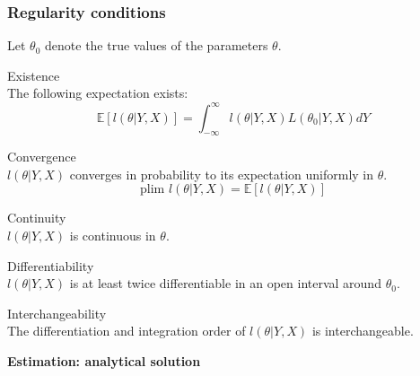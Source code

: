 \documentclass[notes,blackandwhite,mathsans]{beamer}
\begin{document}
\begin{frame}
\frametitle{Regularity conditions}

{\color{mcxs3}Let} $\theta_0$ {\color{mcxs3}denote the} {\color{mcxs2}true values} {\color{mcxs3}of the parameters} $\theta$.

\begin{description}[leftmargin=0.65cm] \small
\item[A1] Existence\\ \footnotesize
{\color{mcxs3}The following expectation exists:}
$$ \mathbb{E}[l(\theta|Y,X)] = \int_{-\infty}^{\infty} l(\theta|Y,X) L(\theta_0|Y,X)dY $$ \small
\item[A2] Convergence\\ \footnotesize
$l(\theta|Y,X)$ {\color{mcxs3}converges in probability to its expectation uniformly in} $\theta$.
$$\text{plim } l(\theta|Y,X)=\mathbb{E}[l(\theta|Y,X)]$$ \small
\item[A3] Continuity \\ \footnotesize
$l(\theta|Y,X)$ {\color{mcxs3}is continuous in} $\theta$. \small
\item[A4] Differentiability\\ \footnotesize
$l(\theta|Y,X)$ {\color{mcxs3}is at least twice differentiable in an open interval around} $\theta_0$.\small
\item[A5]Interchangeability\\ \footnotesize
{\color{mcxs3}The differentiation and integration order of} $l(\theta|Y,X)$ {\color{mcxs3}is interchangeable.}
\end{description}

\end{frame}




{
\begin{frame}

\begin{adjustwidth}{-0.5cm}{0cm}
\vspace{8.3cm}\Large
\textbf{{\color{mcxs1}Estimation:} {\color{mcxs4}analytical solution}}
\end{adjustwidth}

\end{frame}
}
\end{document}

